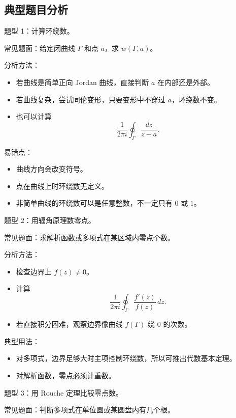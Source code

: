 \documentclass{article}
\begin{document}
\subsection{典型题目分析}

题型 1：计算环绕数。

常见题面：给定闭曲线 \(\Gamma\) 和点 \(a\)，求
\(w(\Gamma,a)\)。

分析方法：

\begin{itemize}
\item
  若曲线是简单正向 Jordan 曲线，直接判断 $a$ 在内部还是外部。
\item
  若曲线复杂，尝试同伦变形，只要变形中不穿过 $a$，环绕数不变。
\item
  也可以计算 \[
  \frac{1}{2\pi i}\oint_\Gamma\frac{dz}{z-a}.
  \]
\end{itemize}

易错点：

\begin{itemize}
\item
  曲线方向会改变符号。
\item
  点在曲线上时环绕数无定义。
\item
  非简单曲线的环绕数可以是任意整数，不一定只有 $0$ 或 $1$。
\end{itemize}

题型 2：用辐角原理数零点。

常见题面：求解析函数或多项式在某区域内零点个数。

分析方法：

\begin{itemize}
\item
  检查边界上 \(f(z)\ne 0\)。
\item
  计算 \[
  \frac{1}{2\pi i}\oint_\Gamma\frac{f'(z)}{f(z)}\,dz.
  \]
\item
  若直接积分困难，观察边界像曲线 \(f(\Gamma)\) 绕 \(0\)
  的次数。
\end{itemize}

典型用法：

\begin{itemize}
\item
  对多项式，边界足够大时主项控制环绕数，所以可推出代数基本定理。
\item
  对解析函数，零点必须计重数。
\end{itemize}

题型 3：用 Rouche 定理比较零点数。

常见题面：判断多项式在单位圆或某圆盘内有几个根。
\end{document}
